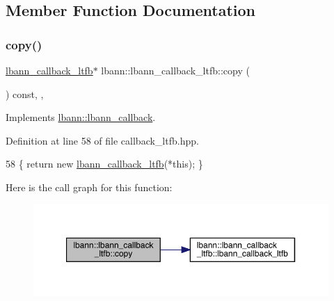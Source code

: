 \subsection{Member Function Documentation}
\mbox{\label{classlbann_1_1lbann__callback__ltfb_a62daf57a8c34fd301e24ba4fa2dd6630}} 
\subsubsection{\texorpdfstring{copy()}{copy()}}
{\footnotesize\ttfamily \hyperlink{classlbann_1_1lbann__callback__ltfb}{lbann\+\_\+callback\+\_\+ltfb}$\ast$ lbann\+::lbann\+\_\+callback\+\_\+ltfb\+::copy (\begin{DoxyParamCaption}{ }\end{DoxyParamCaption}) const\hspace{0.3cm}{\ttfamily [inline]}, {\ttfamily [override]}, {\ttfamily [virtual]}}



Implements \hyperlink{classlbann_1_1lbann__callback_a9f545d1269a8c7af335625d049691f26}{lbann\+::lbann\+\_\+callback}.



Definition at line 58 of file callback\+\_\+ltfb.\+hpp.


\begin{DoxyCode}
58 \{ \textcolor{keywordflow}{return} \textcolor{keyword}{new} \hyperlink{classlbann_1_1lbann__callback__ltfb_a44cb8fdfa7aae5d35543e47f3105f8cb}{lbann\_callback\_ltfb}(*\textcolor{keyword}{this}); \}
\end{DoxyCode}
Here is the call graph for this function\+:\nopagebreak
\begin{figure}[H]
\begin{center}
\leavevmode
\includegraphics[width=350pt]{classlbann_1_1lbann__callback__ltfb_a62daf57a8c34fd301e24ba4fa2dd6630_cgraph}
\end{center}
\end{figure}
\mbox{\label{classlbann_1_1lbann__callback__ltfb_aaf259b187e956282807d4daa03beb502}} 

